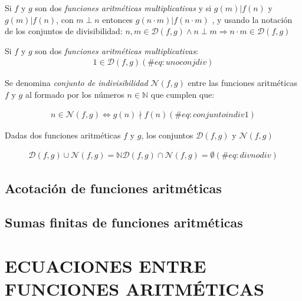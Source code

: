 \documentclass[
  letterpaper,
  DIV=11,
  numbers=noendperiod]{scrreprt}
\begin{document}
\leavevmode{}%
Si \(f\) y \(g\) son dos \emph{funciones aritméticas multiplicativas} y
si \(g(m)|f(n)\) y \(g(m)|f(n)\), con \(m \perp n\) entonces
\(g(n \cdot m) | f(n \cdot m)\) , y usando la notación de los conjuntos
de divisibilidad:
\(n, m \in \mathcal{D}(f,g) \land n \perp m \Rightarrow n \cdot m \in \mathcal{D}(f,g)\)

\leavevmode{}%
Si \(f\) y \(g\) son dos \emph{funciones aritméticas multiplicativas}:
\begin{multline} 
1 \in \mathcal{D}(f,g)
(\#eq:unoconjdiv)
\end{multline}

\leavevmode{}%
Se denomina \emph{conjunto de indivisibilidad} \(\mathcal{N}(f,g)\)
entre las funciones aritméticas \(f\) y \(g\) al formado por los números
\(n \in \mathbb{N}\) que cumplen que:

\begin{multline} 
n \in \mathcal{N}(f,g) \iff g(n) \nmid f(n)
(\#eq:conjuntoindiv1)
\end{multline}

\leavevmode{}%
Dadas dos funciones aritméticas \(f\) y \(g\), los conjuntos
\(\mathcal{D}(f,g)\) y \(\mathcal{N}(f,g)\)

\begin{multline}
\mathcal{D}(f,g) \cup \mathcal{N}(f,g) = \mathbb{N}
\mathcal{D}(f,g) \cap \mathcal{N}(f,g) = \emptyset
(\#eq:divnodiv)
\end{multline}

\hypertarget{acotaciuxf3n-de-funciones-aritmuxe9ticas}{%
\section{Acotación de funciones
aritméticas}\label{acotaciuxf3n-de-funciones-aritmuxe9ticas}}

\hypertarget{sumas-finitas-de-funciones-aritmuxe9ticas}{%
\section{Sumas finitas de funciones
aritméticas}\label{sumas-finitas-de-funciones-aritmuxe9ticas}}


\hypertarget{ecuaciones-entre-funciones-aritmuxe9ticas}{%
\chapter{ECUACIONES ENTRE FUNCIONES
ARITMÉTICAS}\label{ecuaciones-entre-funciones-aritmuxe9ticas}}
\end{document}
